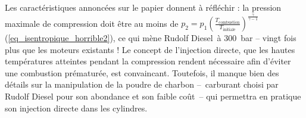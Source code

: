 	Les caractéristiques annoncées sur le papier donnent à réfléchir : la pression maximale de compression doit être au moins de $p_2 = p_1 \left( \frac{T_\text{combustion}}{T_\text{initiale}} \right)^{\frac{\gamma}{\gamma -1}}$ (\ref{eq_isentropique_horrible2}), ce qui mène Rudolf Diesel~à \SI{300}{\bar} -- vingt fois plus que les moteurs existants ! Le concept de l’injection directe, que les hautes températures atteintes pendant la compression rendent nécessaire afin d’éviter une combustion prématurée, est convaincant. Toutefois, il manque bien des détails sur la manipulation de la poudre de charbon --\ carburant choisi par Rudolf Diesel pour son abondance et son faible coût\ -- qui permettra en pratique son injection directe dans les cylindres.

